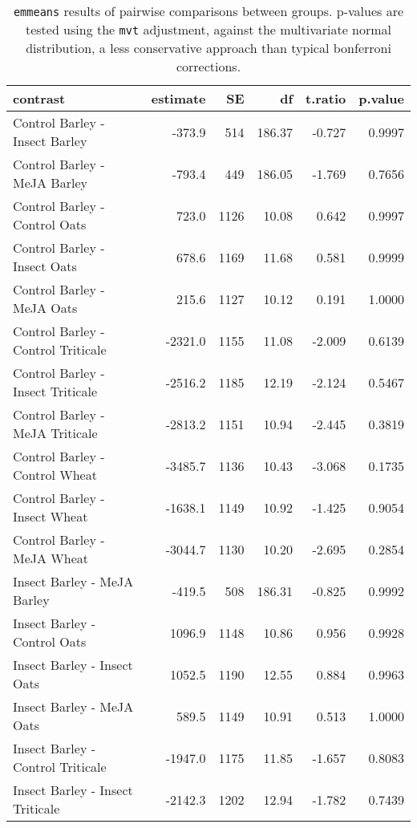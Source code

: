 \begin{table}[ht]
    \centering
    \caption{\verb|emmeans| results of pairwise comparisons between groups. p-values are tested using the \verb|mvt| adjustment, against the  multivariate normal distribution, a less conservative approach than typical bonferroni corrections.}
    \label{Tab:params}
    \begin{tabular}{lrrrrr}
        \hline
        contrast & estimate & SE & df & t.ratio & p.value \\
        \hline
        Control Barley - Insect Barley & -373.9 & 514 & 186.37 & -0.727 & 0.9997 \\
        Control Barley - MeJA Barley & -793.4 & 449 & 186.05 & -1.769 & 0.7656 \\
        Control Barley - Control Oats & 723.0 &1126 & 10.08 & 0.642 & 0.9997 \\
        Control Barley - Insect Oats & 678.6 &1169 & 11.68 & 0.581 & 0.9999 \\
        Control Barley - MeJA Oats & 215.6 &1127 & 10.12 & 0.191 & 1.0000 \\
        Control Barley - Control Triticale &-2321.0 &1155 & 11.08 & -2.009 & 0.6139 \\
        Control Barley - Insect Triticale &-2516.2 &1185 & 12.19 & -2.124 & 0.5467 \\
        Control Barley - MeJA Triticale &-2813.2 &1151 & 10.94 & -2.445 & 0.3819 \\
        Control Barley - Control Wheat &-3485.7 &1136 & 10.43 & -3.068 & 0.1735 \\
        Control Barley - Insect Wheat &-1638.1 &1149 & 10.92 & -1.425 & 0.9054 \\
        Control Barley - MeJA Wheat &-3044.7 &1130 & 10.20 & -2.695 & 0.2854 \\
        Insect Barley - MeJA Barley & -419.5 & 508 & 186.31 & -0.825 & 0.9992 \\
        Insect Barley - Control Oats & 1096.9 &1148 & 10.86 & 0.956 & 0.9928 \\
        Insect Barley - Insect Oats & 1052.5 &1190 & 12.55 & 0.884 & 0.9963 \\
        Insect Barley - MeJA Oats & 589.5 &1149 & 10.91 & 0.513 & 1.0000 \\
        Insect Barley - Control Triticale &-1947.0 &1175 & 11.85 & -1.657 & 0.8083 \\
        Insect Barley - Insect Triticale &-2142.3 &1202 & 12.94 & -1.782 & 0.7439 \\

\end{tabular}
\end{table}
